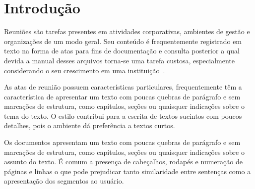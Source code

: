 \chapter{Introdução}\label{chap:introducao}





Reuniões são tarefas presentes em atividades corporativas, ambientes de gestão e organizações de um modo geral. Seu conteúdo é frequentemente registrado em texto na forma de atas para fins de documentação e consulta posterior a qual devida a manual desses arquivos torna-se uma tarefa custosa, especialmente considerando o seu crescimento em uma instituição~\cite{Lee2011, Masakazu2013,Miriam2013}. 





%  
% 
%
As atas de reunião possuem características particulares, frequentemente têm a característica de apresentar um texto com poucas quebras de parágrafo e sem marcações de estrutura, como capítulos, seções ou quaisquer indicações sobre o tema do texto. 
%
O estilo contribui para a escrita de textos sucintos com poucos detalhes, pois o ambiente dá preferência a textos curtos. 






    
 Os documentos apresentam um texto com poucas quebras de parágrafo e sem marcações de estrutura, como capítulos, seções ou quaisquer indicações sobre o assunto do texto. É comum a presença de cabeçalhos, rodapés e numeração de páginas e linhas o que pode prejudicar tanto similaridade entre sentenças como a apresentação dos segmentos ao usuário. %





